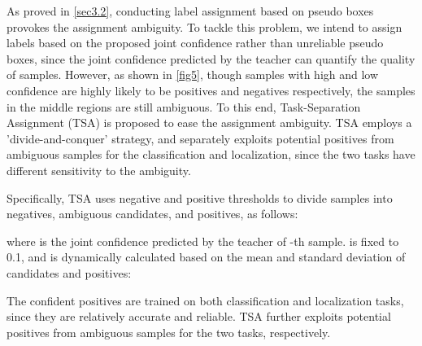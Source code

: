 \documentclass[10pt,twocolumn,letterpaper]{article}
\begin{document}
As proved in \cref{sec3.2}, conducting label assignment based on pseudo boxes provokes the assignment ambiguity.
To tackle this problem, we intend to assign labels based on the proposed joint confidence rather than unreliable pseudo boxes, since the joint confidence predicted by the teacher can quantify the quality of samples.
However, as shown in \cref{fig5}, though samples with high and low confidence are highly likely to be positives and negatives respectively, the samples in the middle regions are still ambiguous.
To this end, Task-Separation Assignment (TSA) is proposed to ease the assignment ambiguity.
TSA employs a 'divide-and-conquer' strategy, and separately exploits potential positives from ambiguous samples for the classification and localization, since the two tasks have different sensitivity to the ambiguity.



Specifically, TSA uses negative and positive thresholds  to divide samples into negatives, ambiguous candidates, and positives, as follows:

where  is the joint confidence predicted by the teacher of -th sample.
 is fixed to 0.1, and  is dynamically calculated based on the mean and standard deviation of candidates and positives:

The confident positives are trained on both classification and localization tasks, since they are relatively accurate and reliable.
TSA further exploits potential positives from ambiguous samples for the two tasks, respectively.
\end{document}
